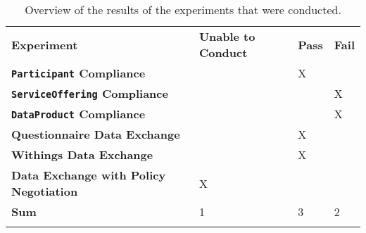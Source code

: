 \begin{longtable}{ |p{7cm}|p{3.5cm}|p{1cm}|p{1cm}| }
	\hhline{----}
	\textbf{Experiment} & \textbf{Unable to Conduct} & \textbf{Pass} & \textbf{Fail}\\
	\hhline{----}
	\textbf{\texttt{Participant} Compliance} &&X&\\
	\hhline{----}
	\textbf{\texttt{ServiceOffering} Compliance} &&&X\\
	\hhline{----}
	\textbf{\texttt{DataProduct} Compliance} &&&X\\
	\hhline{----}
	\textbf{Questionnaire Data Exchange} &&X&\\
	\hhline{----}
	\textbf{Withings Data Exchange} &&X&\\
	\hhline{----}
	\textbf{Data Exchange with Policy Negotiation} &X&&\\
	\hhline{----}
	\textbf{Sum} &1&3&2\\
	\hhline{----}
	\caption{Overview of the results of the experiments that were conducted.}
	\label{tab:results}
\end{longtable}

